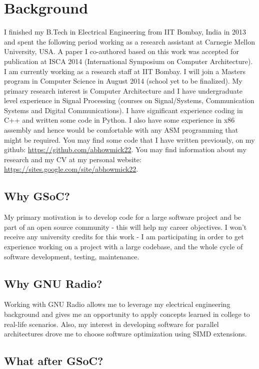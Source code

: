 \documentclass[a4paper,12pt,oneside]{article}
\begin{document}
\section{Background}
I finished my B.Tech in Electrical Engineering from IIT Bombay, India in 2013 and spent the following period working as a research assistant at Carnegie Mellon University, USA. A paper I co-authored based on this work was accepted for publication at ISCA 2014 (International Symposium on Computer Architecture). I am currently working as a research staff at IIT Bombay. I will join a Masters program in Computer Science in August 2014 (school yet to be finalized). My primary research interest is Computer Architecture and I have undergraduate level experience in Signal Processing (courses on Signal/Systems, Communication Systems and Digital Communications). I have significant experience coding in C++ and written some code in Python. I also have some experience in x86 assembly and hence would be comfortable with any ASM programming that might be required. You may find some code that I have written previously, on my github: \url{https://github.com/abhowmick22}. You may find information about my research and my CV at my personal website: \url{https://sites.google.com/site/abhowmick22}.  

\subsection{Why GSoC?}

My primary motivation is to develop code for a large software project and be part of an open source community - this will help my career objectives. I won't receive any university credits for this work - I am participating in order to get experience working on a project with a large codebase, and the whole cycle of software development, testing, maintenance. 

\subsection{Why GNU Radio?}

Working with GNU Radio allows me to leverage my electrical engineering background and gives me an opportunity to apply concepts learned in college to real-life scenarios. Also, my interest in developing software for parallel architectures drove me to choose software optimization using SIMD extensions.

\subsection{What after GSoC?}
\end{document}
